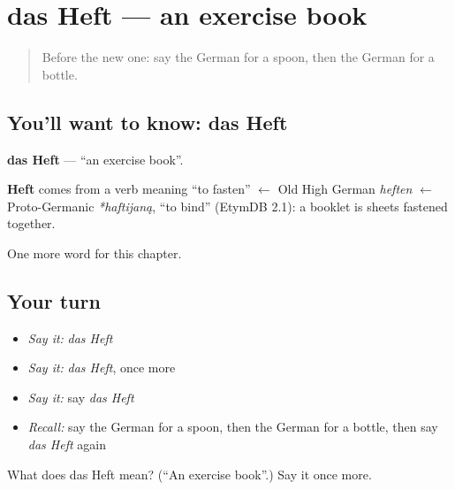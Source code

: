 \section[das Heft]{das Heft — an exercise book}

\label{lesson:GE-C80-heft}



\begin{quote}
Before the new one: say the German for a spoon, then the German for a bottle.
\end{quote}

\subsection*{You'll want to know: das Heft}
\textbf{das Heft} — \textquotedblleft{}an exercise book\textquotedblright{}.

\begin{cousinweb}
\textbf{Heft} comes from a verb meaning \textquotedblleft{}to fasten\textquotedblright{} $\leftarrow$ Old High German \emph{heften} $\leftarrow$ Proto-Germanic \emph{*haftijaną}, \textquotedblleft{}to bind\textquotedblright{} (EtymDB 2.1): a booklet is sheets fastened together.
\end{cousinweb}

\begin{grammarlens}[title={What you've built}]
One more word for this chapter.
\end{grammarlens}

\subsection*{Your turn}
\begin{itemize}
\raggedright
  \item \emph{Say it:} \emph{das Heft}
  \item \emph{Say it:} \emph{das Heft}, once more
  \item \emph{Say it:} say \emph{das Heft}
  \item \emph{Recall:} say the German for a spoon, then the German for a bottle, then say \emph{das Heft} again
\end{itemize}

\begin{tcolorbox}[breakable,colback=teal!4,colframe=teal!35!black,title={Before you move on}]
What does das Heft mean? (\textquotedblleft{}An exercise book\textquotedblright{}.) Say it once more.
\end{tcolorbox}
